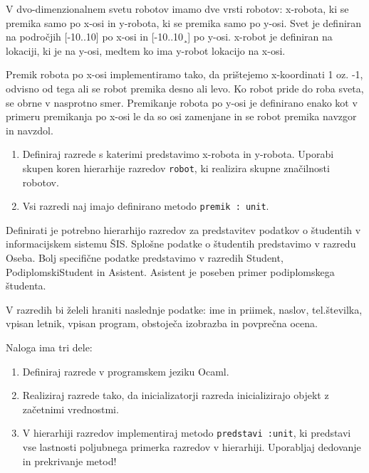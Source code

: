 \begin{ex}
V dvo-dimenzionalnem svetu robotov imamo dve vrsti robotov: x-robota, ki se premika samo po x-osi in y-robota, ki se premika samo po y-osi. Svet je definiran na področjih [-10..10] po x-osi in [-10..10¸] po y-osi. x-robot je definiran na lokaciji, ki je na y-osi, medtem ko ima y-robot lokacijo na x-osi. 

Premik robota po x-osi implementiramo tako, da pri\v stejemo x-koordinati 1 oz. -1, odvisno od tega ali se robot premika desno ali levo. Ko robot pride do roba sveta, se obrne v nasprotno smer. Premikanje robota po y-osi je definirano enako kot v primeru premikanja po x-osi le da so osi zamenjane in se robot premika navzgor in navzdol.

\begin{enumerate}
\item Definiraj razrede s katerimi predstavimo x-robota in y-robota. Uporabi skupen koren hierarhije razredov \lstinline{robot}, ki realizira skupne značilnosti robotov.

\item Vsi razredi naj imajo definirano metodo \lstinline{premik : unit}. 
\end{enumerate}
\end{ex} 





\begin{ex}
Definirati je potrebno hierarhijo razredov za predstavitev podatkov o \v studentih v informacijskem sistemu \v SIS. Splo\v sne podatke o \v studentih predstavimo v razredu Oseba. Bolj specifi\v cne podatke predstavimo v razredih Student, PodiplomskiStudent in Asistent.
Asistent je poseben primer podiplomskega \v studenta. 

V razredih bi \v zeleli hraniti naslednje podatke: ime in priimek, naslov, tel.\v stevilka, vpisan letnik, vpisan program, obstoje\v ca izobrazba in povpre\v cna ocena. 

Naloga ima tri dele:

\begin{enumerate}
\item Definiraj razrede v programskem jeziku Ocaml.

\item Realiziraj razrede tako, da inicializatorji razreda inicializirajo objekt z za\v cetnimi vrednostmi.

\item V hierarhiji razredov implementiraj metodo \lstinline{predstavi :unit}, ki predstavi vse lastnosti poljubnega primerka razredov v hierarhiji. Uporabljaj dedovanje in prekrivanje metod!
\end{enumerate}
\end{ex}




